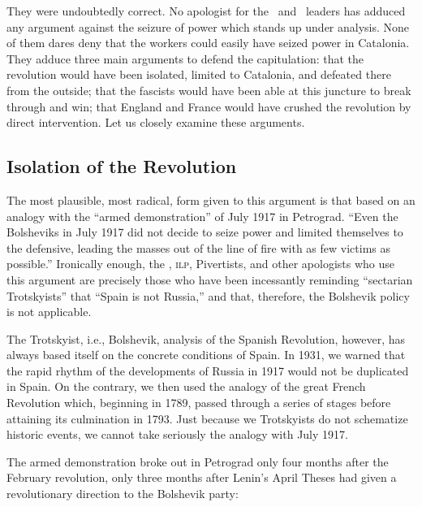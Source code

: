 They were undoubtedly correct. No apologist for the \CNT\ and \POUM\ leaders has adduced any argument against the seizure of power which stands up under analysis. None of them dares deny that the workers could easily have seized power in Catalonia. They adduce three main arguments to defend the capitulation: that the revolution would have been isolated, limited to Catalonia, and defeated there from the outside; that the fascists would have been able at this juncture to break through and win; that England and France would have crushed the revolution by direct intervention. Let us closely examine these arguments.

\subsection*{Isolation of the Revolution}

The most plausible, most radical, form given to this argument is that based on an analogy with the ``armed demonstration'' of July 1917 in Petrograd. ``Even the Bolsheviks in July 1917 did not decide to seize power and limited themselves to the defensive, leading the masses out of the line of fire with as few victims as possible.'' Ironically enough, the \POUM\kn, \textsc{ilp,} Pivertists, and other apologists who use this argument are precisely those who have been incessantly reminding ``sectarian Trotskyists'' that ``Spain is not Russia,'' and that, therefore, the Bolshevik policy is not applicable.

The Trotskyist, i.e., Bolshevik, analysis of the Spanish Revolution, however, has always based itself on the concrete conditions of Spain. In 1931, we warned that the rapid rhythm of the developments of Russia in 1917 would not be duplicated in Spain. On the contrary, we then used the analogy of the great French Revolution which, beginning in 1789, passed through a series of stages before attaining its culmination in 1793. Just because we Trotskyists do not schematize historic events, we cannot take seriously the analogy with July 1917.

\begin{sloppypar}
  The armed demonstration broke out in Petrograd only four months after the February revolution, only three months after Lenin’s April Theses had given a revolutionary direction to the Bolshevik party:
\end{sloppypar}

